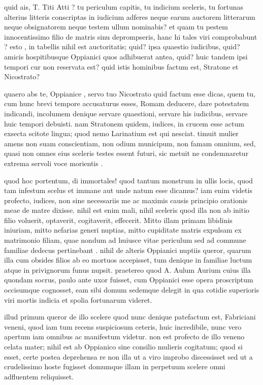  quid ais, T. Titi Atti ? tu periculum capitis, tu indicium sceleris, tu fortunas alterius litteris conscriptas in iudicium adferes neque earum auctorem litterarum neque obsignatorem neque testem ullum nominabis? et quam tu pestem innocentissimo filio de matris sinu deprompseris, hanc hi tales viri comprobabunt ? esto , in tabellis nihil est auctoritatis; quid? ipsa quaestio iudicibus, quid? amicis hospitibusque Oppianici quos adhibuerat antea, quid? huic tandem ipsi tempori cur non reservata est? quid istis hominibus factum est, Stratone et Nicostrato?

 quaero abs te, Oppianice , servo tuo Nicostrato quid factum esse dicas, quem tu, cum hunc brevi tempore accusaturus esses, Romam deducere, dare potestatem indicandi, incolumem denique servare quaestioni, servare his iudicibus, servare huic tempori debuisti. nam Stratonem quidem, iudices, in crucem esse actum exsecta scitote lingua; quod nemo Larinatium est qui nesciat. timuit mulier amens non suam conscientiam, non odium municipum, non famam omnium, sed, quasi non omnes eius sceleris testes essent futuri, sic metuit ne condemnaretur extrema servoli voce morientis .

 quod hoc portentum, di immortales! quod tantum monstrum in ullis locis, quod tam infestum scelus et immane aut unde natum esse dicamus? iam enim videtis profecto, iudices, non sine necessariis me ac maximis causis principio orationis meae de matre dixisse. nihil est enim mali, nihil sceleris quod illa non ab initio filio voluerit, optaverit, cogitaverit, effecerit. Mitto illam primam libidinis iniuriam, mitto nefarias generi nuptias, mitto cupiditate matris expulsam ex matrimonio filiam, quae nondum ad huiusce vitae periculum sed ad commune familiae dedecus pertinebant . nihil de alteris Oppianici nuptiis queror, quarum illa cum obsides filios ab eo mortuos accepisset, tum denique in familiae luctum atque in privignorum funus nupsit. praetereo quod A. Aulum Aurium cuius illa quondam socrus, paulo ante uxor fuisset, cum Oppianici esse opera proscriptum occisumque cognosset, eam sibi domum sedemque delegit in qua cotidie superioris viri mortis indicia et spolia fortunarum videret.

 illud primum queror de illo scelere quod nunc denique patefactum est, Fabriciani veneni, quod iam tum recens suspiciosum ceteris, huic incredibile, nunc vero apertum iam omnibus ac manifestum videtur. non est profecto de illo veneno celata mater; nihil est ab Oppianico sine consilio mulieris cogitatum; quod si esset, certe postea deprehensa re non illa ut a viro improbo discessisset sed ut a crudelissimo hoste fugisset domumque illam in perpetuum scelere omni adfluentem reliquisset.

